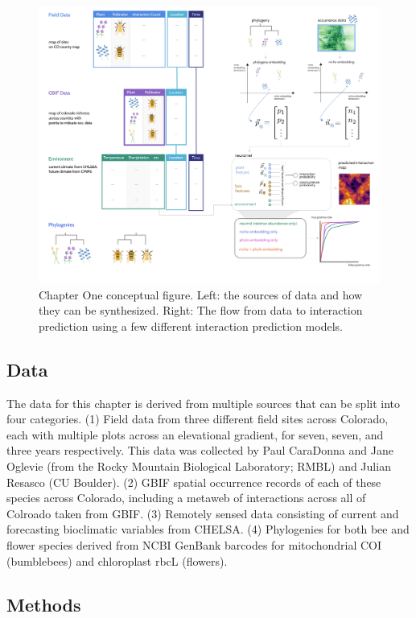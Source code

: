 \documentclass[11pt]{article}
\makeatletter
\def\maxwidth{\ifdim\Gin@nat@width>\linewidth\linewidth
\else\Gin@nat@width\fi}
\let\Oldincludegraphics\includegraphics
\renewcommand{\includegraphics}[1]{\Oldincludegraphics[width=\maxwidth]{#1}}
\makeatother
\begin{document}
\begin{figure}
\centering
\includegraphics{./figures/ch1.png}
\caption{Chapter One conceptual figure. Left: the sources of data and
how they can be synthesized. Right: The flow from data to interaction
prediction using a few different interaction prediction models.}
\end{figure}

\hypertarget{data}{%
\subsection{Data}\label{data}}

The data for this chapter is derived from multiple sources that can be
split into four categories. (1) Field data from three different field
sites across Colorado, each with multiple plots across an elevational
gradient, for seven, seven, and three years respectively. This data was
collected by Paul CaraDonna and Jane Oglevie (from the Rocky Mountain
Biological Laboratory; RMBL) and Julian Resasco (CU Boulder). (2) GBIF
spatial occurrence records of each of these species across Colorado,
including a metaweb of interactions across all of Colroado taken from
GBIF. (3) Remotely sensed data consisting of current and forecasting
bioclimatic variables from CHELSA. (4) Phylogenies for both bee and
flower species derived from NCBI GenBank barcodes for mitochondrial COI
(bumblebees) and chloroplast rbcL (flowers).

\hypertarget{methods}{%
\subsection{Methods}\label{methods}}
\end{document}
